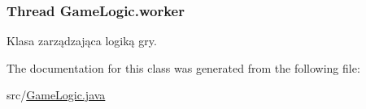 \hypertarget{classGameLogic_a63998de862313caa158c414ad3a8dad0}{
\subsubsection[{worker}]{\setlength{\rightskip}{0pt plus 5cm}Thread Game\-Logic.\-worker\hspace{0.3cm}{\ttfamily [private]}}}\label{classGameLogic_a63998de862313caa158c414ad3a8dad0}
Klasa zarządzająca logiką gry. 

The documentation for this class was generated from the following file\-:\begin{DoxyCompactItemize}
\item 
src/\hyperlink{GameLogic_8java}{Game\-Logic.\-java}\end{DoxyCompactItemize}
